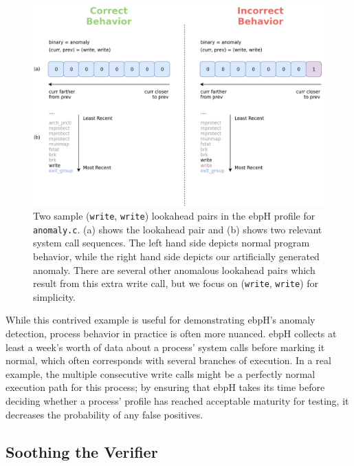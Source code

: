 \documentclass[
  12pt]{findlay}
\begin{document}
\begin{figure}[p]
\includegraphics{../figures/lookahead-anomaly.png}
\caption[Two sample (\lstinline{write}, \lstinline{write}) lookahead pairs in the ebpH profile for \texttt{anomaly.c}]{
    Two sample (\lstinline{write}, \lstinline{write}) lookahead pairs in the ebpH profile for \texttt{anomaly.c}.
    (a) shows the lookahead pair and (b) shows two relevant system call sequences. The left hand side depicts normal program
    behavior, while the right hand side depicts our artificially generated anomaly.
    There are several other anomalous lookahead pairs which result from this extra write call, but we focus
    on (\lstinline{write}, \lstinline{write}) for simplicity.
}
\label{anomaly-lookahead-comp}
\end{figure}

While this contrived example is useful for demonstrating ebpH's anomaly
detection, process behavior in practice is often more nuanced. ebpH
collects at least a week's worth of data about a process' system calls
before marking it normal, which often corresponds with several branches
of execution. In a real example, the multiple consecutive write calls
might be a perfectly normal execution path for this process; by ensuring
that ebpH takes its time before deciding whether a process' profile has
reached acceptable maturity for testing, it decreases the probability of
any false positives.

\hypertarget{soothing-the-verifier}{%
\subsection{Soothing the Verifier}\label{soothing-the-verifier}}
\end{document}
